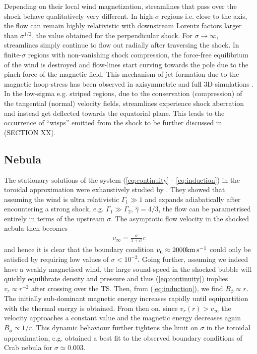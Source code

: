 Depending on their local wind magnetization, streamlines that pass over the shock behave qualitatively very different.  
In high-$\sigma$ regions i.e. close to the axis, the flow can remain highly relativistic with downstream Lorentz factors larger than $\sigma^{1/2}$, the value obtained for the perpendicular shock.  For $\sigma\to\infty$, streamlines simply continue to flow out radially after traversing the shock.  In finite-$\sigma$ regions with non-vanishing shock compression, the force-free equilibrium of the wind is destroyed and flow-lines start curving towards the pole due to the pinch-force of the magnetic field.  This mechanism of jet formation due to the magnetic hoop-stress has been observed in axisymmetric \citep[e.g.][]{komissarov2003a} and full 3D simulations \citep[e.g.][]{PorthKomissarov2014a}.  
In the low-sigma e.g. striped regions, due to the conservation (compression) of the tangential (normal) velocity fields, streamlines experience shock aberration and instead get  deflected towards the equatorial plane.  This leads to the occurrence of ``wisps'' emitted from the shock to be further discussed in (SECTION XX).  


\subsection{Nebula}

The stationary solutions of the system (\ref{eq:continuity} - \ref{eq:induction}) in the toroidal approximation were exhaustively studied by \cite{1984ApJ...283..694K}.  They showed that assuming the wind is ultra relativistic $\Gamma_1\gg1$ and expands adiabatically after encountering a strong shock, e.g. $\Gamma_1\gg\Gamma_2$, $\hat{\gamma}=4/3$, the flow can be parametrised entirely in terms of the upstream $\sigma$.  
The asymptotic flow velocity in the shocked nebula then becomes
\begin{align}
v_{\infty} = \frac{\sigma}{1+\sigma} c
\end{align}
and hence it is clear that the boundary condition $v_{\rm n}\approx 2000 \rm km\, s^{-1}$ could only be satisfied by requiring low values of $\sigma<10^{-2}$.  
Going further, assuming we indeed have a weakly magnetised wind, the large sound-speed in the shocked bubble will quickly equilibrate density and pressure and thus (\ref{eq:continuity}) implies $v_r\propto r^{-2}$ after crossing over the TS.  Then, from (\ref{eq:induction}), we find $B_\phi\propto r$.  The initially sub-dominant magnetic energy increases rapidly until equipartition with the thermal energy is obtained.  From then on, since $v_r(r)>v_{\infty}$ the velocity approaches a constant value and the magnetic energy decreases again $B_\phi\propto 1/r$.  
This dynamic behaviour further tightens the limit on $\sigma$ in the toroidal approximation, e.g. \cite{1984ApJ...283..694K} obtained a best fit to the observed boundary conditions of Crab nebula for $\sigma\simeq 0.003$.  

